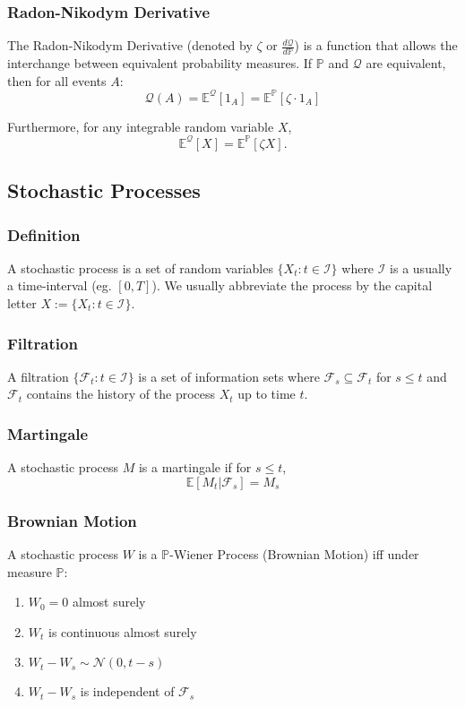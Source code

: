 \documentclass[11pt]{article}
\newcommand{\E}{\mathbb{E}}
\newcommand{\F}{\mathcal{F}}
\newcommand{\PR}{\mathbb{P}}
\renewcommand{\Pr}{\mathbb{P}}
\newcommand{\Q}{\mathcal{Q}}
\begin{document}
	\subsubsection{Radon-Nikodym Derivative}
	The Radon-Nikodym Derivative (denoted by \( \zeta \) or \( \frac{d\Q}{d\PR} \)) is a function that allows the interchange between equivalent probability measures. If \( \PR \) and \( \Q \) are equivalent, then for all events \( A \):
	\[	\Q(A) = \E^{\Q}[1_{A}] = \E^{\PR}\left[\zeta\cdot 1_{A}\right]
		\]
		
	\noindent Furthermore, for any integrable random variable \( X \),
	\[
		\E^{\Q}[X] = \E^{\Pr}[\zeta X].
		\]
	\subsection{Stochastic Processes}
	\subsubsection{Definition}
	A stochastic process is a set of random variables \( \{X_t : t\in \mathcal{I}\} \) where \( \mathcal{I} \) is a usually a time-interval (eg. \( [0, T] \)). We usually abbreviate the process by the capital letter \( X:= \{X_t:t\in\mathcal{I}\} \).
	\subsubsection{Filtration}
	A filtration \( \{\mathcal{F}_t:t\in\mathcal{I}\} \) is a set of information sets where \( \F_s\subseteq \F_t \) for \( s\leq t \) and \( \F_t \) contains the history of the process \( X_t \) up to time \( t \).
	\subsubsection{Martingale}
	A stochastic process \( M \) is a martingale if for \( s\leq t \),
	\[	\E[M_t | \mathcal{F}_s] = M_s\]
	\subsubsection{Brownian Motion}
	A stochastic process \( W \) is a \( \PR \)-Wiener Process (Brownian Motion) iff under measure \( \PR \):
	\begin{enumerate}
		\item \( W_0 = 0 \) almost surely
		\item \( W_t \) is continuous almost surely
		\item \( W_t - W_s \sim\mathcal{N}(0, t-s) \)
		\item \( W_t - W_s \) is independent of \( \mathcal{F}_s \)
	\end{enumerate}
\end{document}
